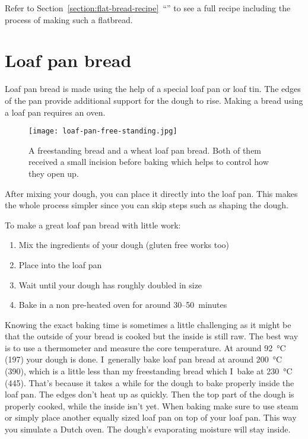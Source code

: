 Refer to Section~\ref{section:flat-bread-recipe}~``''
to see a full recipe including the process of making such a flatbread.

\section{Loaf pan bread}

Loaf pan bread is made using the help of a special loaf pan
or loaf tin. The edges of the pan provide additional support
for the dough to rise. Making a bread using a loaf pan requires
an oven.

\begin{figure}[!htb]
  \texttt{[image: loaf-pan-free-standing.jpg]}
  \caption{A freestanding bread and a wheat loaf pan bread. Both of them
  received a small incision before baking which helps to control how they open up.}%
  \label{fig:free-standing-loaf-pan}
\end{figure}

After mixing your dough, you can place it directly into the loaf pan.
This makes the whole process simpler since you can skip steps such
as shaping the dough.

To make a great loaf pan bread with little work:

\begin{enumerate}
    \item Mix the ingredients of your dough (gluten free works too)
    \item Place into the loaf pan
    \item Wait until your dough has roughly doubled in size
    \item Bake in a non pre-heated oven for around 30--50~minutes
\end{enumerate}

Knowing the exact baking time is sometimes a little challenging
as it might be that the outside of your bread is cooked but
the inside is still raw. The best way is to use a thermometer
and measure the core temperature. At around  \qty{92}{\degreeCelsius}
(\qty{197}{\degF}) your dough is done. I~generally bake loaf pan bread at
around  \qty{200}{\degreeCelsius} (\qty{390}{\degF}), which is a little less
than my freestanding bread which I~bake at  \qty{230}{\degreeCelsius}
(\qty{445}{\degF}). That's because it takes a while for the dough
to bake properly inside the loaf pan. The edges don't heat up
as quickly. Then the top part of the dough is properly cooked, while
the inside isn't yet. When baking make sure to use steam
or simply place another equally sized loaf pan on top
of your loaf pan. This way you simulate a Dutch oven. The dough's
evaporating moisture will stay inside.

